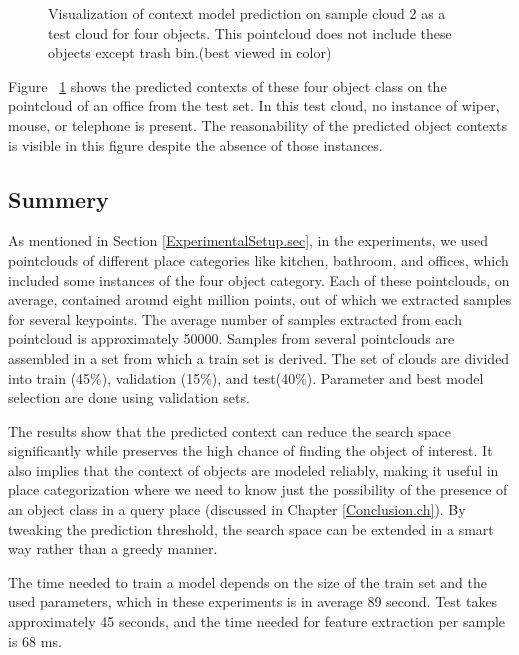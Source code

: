 \begin{figure} [htp]
\begin{center}
  \end{center}
  \caption[Visualization of context model prediction on sample cloud 2 as a test cloud.]
  {Visualization of context model prediction on sample cloud 2 as a test cloud for four objects. This pointcloud does not include 
  these objects except trash bin.(best viewed in color)}
  \label{ContextPrediction_Test_512.figure:edge}
\end{figure}

Figure ~\ref{ContextPrediction_Test_512.figure:edge} shows the predicted contexts of these four object class on the 
pointcloud of an office from the test set.
In this test cloud, no instance of wiper, mouse, or telephone is present.
The reasonability of the predicted object contexts is visible in this figure despite the absence of those instances.

\subsection*{Summery}
As mentioned in Section \ref{ExperimentalSetup.sec}, in the experiments, we used pointclouds of different place categories like 
kitchen, bathroom, and offices, which included some instances of the four object category.
Each of these pointclouds, on average, contained around eight million points, out of which we extracted samples for several keypoints.
The average number of samples extracted from each pointcloud is approximately 50000.
Samples from several pointclouds are assembled in a set from which a train set is derived.
The set of clouds are divided into train (45\%), validation (15\%), and test(40\%).
Parameter and best model selection are done using validation sets.

The results show that the predicted context can reduce the search space significantly while preserves the high chance of
finding the object of interest.
It also implies that the context of objects are modeled reliably, making it useful in place categorization where
we need to know just the possibility of the presence of an object class in a query place (discussed in Chapter \ref{Conclusion.ch}). 
By tweaking the prediction threshold, the search space can be extended in a smart way rather than a greedy manner.

The time needed to train a model depends on the size of the train set and the used parameters, which in these experiments is in average
89 second.
Test takes approximately 45 seconds, and the time needed for feature extraction per sample is 68 ms.


